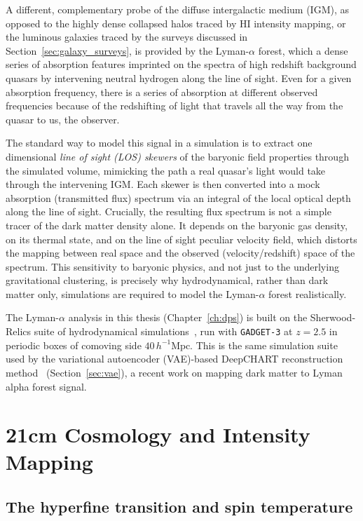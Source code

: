 A different, complementary probe of the diffuse intergalactic medium (IGM), as opposed to the highly dense collapsed halos traced by HI intensity mapping, or the luminous galaxies traced by the surveys discussed in Section~\ref{sec:galaxy_surveys}, is provided by the Lyman-$\alpha$ forest, which a dense series of absorption features imprinted on the spectra of high redshift background quasars by intervening neutral hydrogen along the line of sight. Even for a given absorption frequency, there is a series of absorption at different observed frequencies because of the redshifting of light that travels all the way from the quasar to us, the observer.

The standard way to model this signal in a simulation is to extract one dimensional \emph{line of sight (LOS) skewers} of the baryonic field properties through the simulated volume, mimicking the path a real quasar's light would take through the intervening IGM. Each skewer is then converted into a mock absorption (transmitted flux) spectrum via an integral of the local optical depth along the line of sight. Crucially, the resulting flux spectrum is not a simple tracer of the dark matter density alone. It depends on the baryonic gas density, on its thermal state, and on the line of sight peculiar velocity field, which distorts the mapping between real space and the observed (velocity/redshift) space of the spectrum. This sensitivity to baryonic physics, and not just to the underlying gravitational clustering, is precisely why hydrodynamical, rather than dark matter only, simulations are required to model the Lyman-$\alpha$ forest realistically.

The Lyman-$\alpha$ analysis in this thesis (Chapter~\ref{ch:dps}) is built on the Sherwood-Relics suite of hydrodynamical simulations~\citep{bolton_sherwood_2017,puchwein_sherwood-relics_2023}, run with \texttt{GADGET-3} at $z=2.5$ in periodic boxes of comoving side $40\,h^{-1}\mathrm{Mpc}$. This is the same simulation suite used by the variational autoencoder (VAE)-based DeepCHART reconstruction method~\citep{Maitra_2026} (Section~\ref{sec:vae}), a recent work on mapping dark matter to Lyman alpha forest signal.

\section{21cm Cosmology and Intensity Mapping}
\label{sec:21cm_im}

\subsection{The hyperfine transition and spin temperature}

